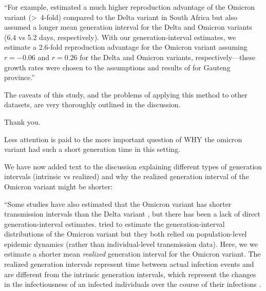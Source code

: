 \documentclass[12pt]{article}
\newcommand{\revtext}{\textsf}
\begin{document}
``For example, \cite{pearson2021bounding} estimated a much higher reproduction advantage of the Omicron variant (\textgreater\ 4-fold) compared to the Delta variant in South Africa but also assumed a longer mean generation interval for the Delta and Omicron variants (6.4 vs 5.2 days, respectively).
With our generation-interval estimates, we estimate a 2.6-fold reproduction advantage for the Omicron variant assuming $r=-0.06$ and $r=0.26$ for the Delta and Omicron variants, respectively---these growth rates were chosen to the assumptions and results of \cite{pearson2021bounding} for Gauteng province.''

\revtext{The caveats of this study, and the problems of applying this method to other datasets, are very thoroughly outlined in the discussion.} 

Thank you.

\revtext{Less attention is paid to the more important question of WHY the omicron variant had such a short generation time in this setting.}

We have now added text to the discussion explaining different types of generation intervals (intrinsic vs realized) and why the realized generation interval of the Omicron variant might be shorter:

``Some studies have also estimated that the Omicron variant has shorter transmission intervals than the Delta variant \citep{abbott2022test,kremer2022observed,song2022serial}, but there has been a lack of direct generation-interval estimates.
\cite{ito2022estimating,selby2022generation} tried to estimate the generation-interval distributions of the Omicron variant but they both relied on population-level epidemic dynamics (rather than individual-level transmission data).
Here, we we estimate a shorter mean \emph{realized} generation interval for the Omicron variant.
The realized generation intervals represent time between actual infection events and are different from the intrinsic generation intervals, which represent the changes in the infectiousness of an infected individuals over the course of their infections \citep{champredon2015intrinsic}. 
\end{document}

